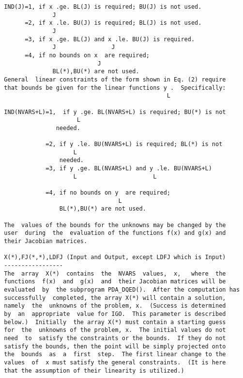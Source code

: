 \begin{verbatim}
  IND(J)=1, if x .ge. BL(J) is required; BU(J) is not used.
                J
        =2, if x .le. BU(J) is required; BL(J) is not used.
                J
        =3, if x .ge. BL(J) and x .le. BU(J) is required.
                J                J
        =4, if no bounds on x  are required;
                             J
                BL(*),BU(*) are not used.
  General  linear constraints of the form shown in Eq. (2) require
  that bounds be given for the linear functions y .  Specifically:
                                                 L

  IND(NVARS+L)=1,  if y .ge. BL(NVARS+L) is required; BU(*) is not
                       L
                 needed.

              =2, if y .le. BU(NVARS+L) is required; BL(*) is not
                      L
                  needed.
              =3, if y .ge. BL(NVARS+L) and y .le. BU(NVARS+L)
                      L                      L

              =4, if no bounds on y  are required;
                                   L
                  BL(*),BU(*) are not used.

  The  values of the bounds for the unknowns may be changed by the
  user  during  the  evaluation of the functions f(x) and g(x) and
  their Jacobian matrices.

  X(*),FJ(*,*),LDFJ (Input and Output, except LDFJ which is Input)
  -----------------
  The  array  X(*)  contains  the  NVARS  values,  x,   where  the
  functions  f(x)  and  g(x)  and  their Jacobian matrices will be
  evaluated  by  the subprogram PDA_DQED().  After the computation has
  successfully  completed, the array X(*) will contain a solution,
  namely  the  unknowns of the problem, x.  (Success is determined
  by  an  appropriate  value for IGO.  This parameter is described
  below.)  Initially  the array X(*) must contain a starting guess
  for  the  unknowns of the problem, x.  The initial values do not
  need  to  satisfy the constraints or the bounds.  If they do not
  satisfy the bounds, then the point will be simply projected onto
  the  bounds  as  a  first  step.  The first linear change to the
  values  of  x must satisfy the general constraints.  (It is here
  that the assumption of their linearity is utilized.)


\end{verbatim}
